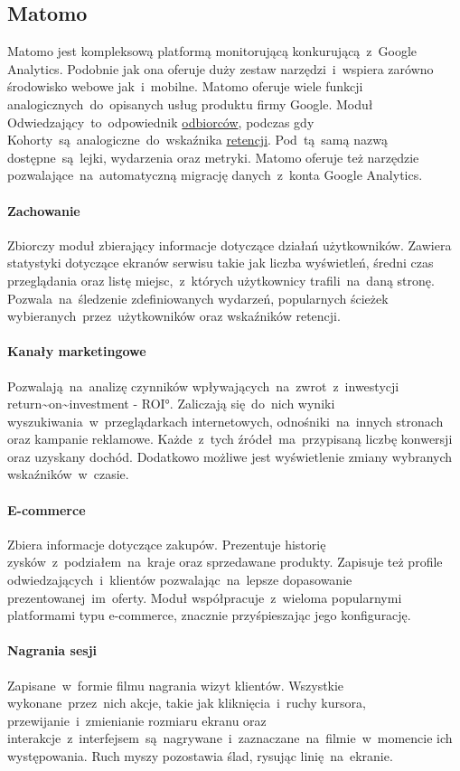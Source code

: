 \subsection{Matomo}
\label{sec:matomo}
Matomo jest kompleksową platformą monitorującą konkurującą~z~Google Analytics. Podobnie jak ona oferuje duży zestaw narzędzi~i~wspiera zarówno środowisko webowe jak~i~mobilne. Matomo oferuje wiele funkcji analogicznych~do~opisanych usług produktu firmy Google. Moduł Odwiedzający~to~odpowiednik \hyperref[par:ga-audiences]{odbiorców}, podczas gdy Kohorty~są~analogiczne~do~wskaźnika \hyperref[par:ga-retention]{retencji}. Pod~tą~samą nazwą dostępne~są~lejki, wydarzenia oraz metryki. Matomo oferuje też narzędzie pozwalające~na~automatyczną migrację danych~z~konta Google Analytics.

\paragraph{Zachowanie}
Zbiorczy moduł zbierający informacje dotyczące działań użytkowników. Zawiera statystyki dotyczące ekranów serwisu takie jak liczba wyświetleń, średni czas przeglądania oraz listę miejsc,~z~których użytkownicy trafili~na~daną stronę. Pozwala~na~śledzenie zdefiniowanych wydarzeń, popularnych ścieżek wybieranych~przez~użytkowników oraz wskaźników retencji.

\paragraph{Kanały marketingowe}
Pozwalają~na~analizę czynników wpływających~na~zwrot~z~inwestycji \ang{return~on~investment - ROI}. Zaliczają się~do~nich wyniki wyszukiwania~w~przeglądarkach internetowych, odnośniki~na~innych stronach oraz kampanie reklamowe. Każde~z~tych źródeł~ma~przypisaną liczbę konwersji oraz uzyskany dochód. Dodatkowo możliwe jest wyświetlenie zmiany wybranych wskaźników~w~czasie.

\paragraph{E-commerce}
Zbiera informacje dotyczące zakupów. Prezentuje historię zysków~z~podziałem~na~kraje oraz sprzedawane produkty. Zapisuje też profile odwiedzających~i~klientów pozwalając~na~lepsze dopasowanie prezentowanej~im~oferty. Moduł współpracuje~z~wieloma popularnymi platformami typu e-commerce, znacznie przyśpieszając jego konfigurację.

\paragraph{Nagrania sesji}
Zapisane~w~formie filmu nagrania wizyt klientów. Wszystkie wykonane~przez~nich akcje, takie jak kliknięcia~i~ruchy kursora, przewijanie~i~zmienianie rozmiaru ekranu oraz interakcje~z~interfejsem~są~nagrywane~i~zaznaczane~na~filmie~w~momencie ich występowania. Ruch myszy pozostawia ślad, rysując linię~na~ekranie.

